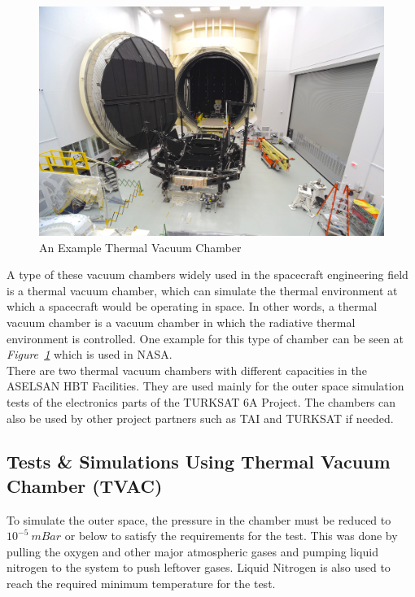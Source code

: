 \begin{figure}[h!]
	\center
	\setlength{\unitlength}{\textwidth} 
	\includegraphics[width=1.0\unitlength]{tvac}
	\caption{\label{fig:tvac}An Example Thermal Vacuum Chamber \cite{tvac}}
\end{figure}

	A type of these vacuum chambers widely used in the spacecraft engineering field is a thermal vacuum chamber, which can simulate the thermal environment at which a spacecraft would be operating in space. In other words,	a thermal vacuum chamber is a vacuum chamber in which the radiative thermal environment is controlled. One example for this type of chamber can be seen at \textit{Figure~\ref{fig:tvac}} which is used in NASA.\\


	There are two thermal vacuum chambers with different capacities in the ASELSAN HBT Facilities. They are used mainly for the outer space simulation tests of the electronics parts of the TURKSAT 6A Project. The chambers can also be used by other project partners such as TAI and TURKSAT if needed.
	
\newpage	
\subsection{Tests \& Simulations Using Thermal Vacuum Chamber (TVAC) }
\- \indent
	To simulate the outer space, the pressure in the chamber must be reduced to $10^{-5}~mBar$ or below to satisfy the requirements for the test. This was done by pulling the oxygen and other major atmospheric gases and pumping liquid nitrogen to the system to push leftover gases. Liquid Nitrogen is also used to reach the required minimum temperature for the test.\\
	
